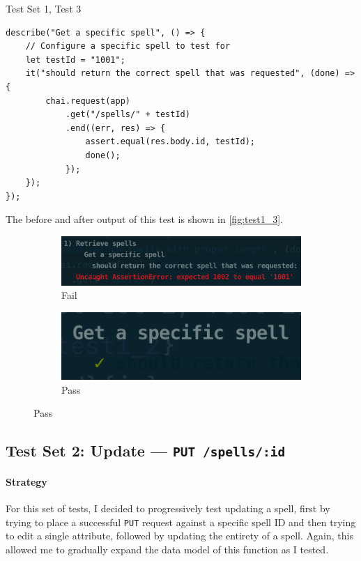 \begin{listing}[h]
\caption{Test Set 1, Test 3}
\label{lis:test1_3}
\begin{verbatim}
describe("Get a specific spell", () => {
	// Configure a specific spell to test for
	let testId = "1001";
	it("should return the correct spell that was requested", (done) => {
		chai.request(app)
			.get("/spells/" + testId)
			.end((err, res) => {
				assert.equal(res.body.id, testId);
				done();
			});
	});
});

\end{verbatim}
\end{listing}
The before and after output of this test is shown in \autoref{fig:test1_3}.
\begin{figure}[h]
\caption{Test output for test set 1, test 3}
\label{fig:test1_3}
	\centering
	\begin{subfigure}[b]{0.5\textwidth}
		\centering
		\includegraphics[width=\textwidth]{images/13_fail}
		\caption{Fail}
		\label{fig:test13_fail}
	\end{subfigure}
	\hfill
	\begin{subfigure}[b]{0.5\textwidth}
		\centering
		\includegraphics[width=\textwidth]{images/13_pass}
		\caption{Pass}
		\label{fig:test13_pass}
	\end{subfigure}
\end{figure}

\subsection{Test Set 2: Update --- \texttt{PUT /spells/:id}}

\paragraph{Strategy} For this set of tests, I decided to progressively test updating a spell, first by trying to place a successful \texttt{PUT} request against a specific spell ID and then trying to edit a single attribute, followed by updating the entirety of a spell. Again, this allowed me to gradually expand the data model of this function as I tested.

